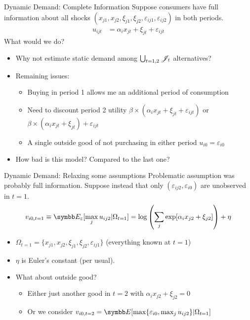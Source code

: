 \documentclass[aspectratio=169,11pt]{beamer}
\begin{document}
\begin{frame}{Dynamic Demand: Complete Information}
Suppose consumers have full information about all shocks $(x_{j1},x_{j2},\xi_{j1},\xi_{j2},\varepsilon_{ij1},\varepsilon_{ij2})$ in both periods. 
\begin{align*}
u_{ijt} &=   \alpha_i x_{jt}  +  \xi_{jt} + \varepsilon_{ijt}
\end{align*}
What would we do?
\begin{itemize}
\item Why not estimate static demand among $\bigcup_{t=1,2}  \mathscr{J}_t $ alternatives?
\item Remaining issues:
\begin{itemize}
\item Buying in period 1 allows me an additional period of consumption
\item Need to discount period 2 utility $\beta \times ( \alpha_i x_{jt}  +  \xi_{jt} + \varepsilon_{ijt})$ or $\beta \times ( \alpha_i x_{jt}  +  \xi_{jt} )+\varepsilon_{ijt}$
\item A single outside good of not purchasing in either period $ u_{i0} =  \varepsilon_{i0} $
\end{itemize}
\item How bad is this model? Compared to the last one?
\end{itemize}
\end{frame}



\begin{frame}{Dynamic Demand: Relaxing some assumptions}
Problematic assumption was probably full information. Suppose instead that only $(\varepsilon_{ij2},\varepsilon_{i0})$ are \alert{unobserved} in $t=1$. 
\begin{align*}
v_{i0,t=1} \equiv \E_{\varepsilon} [\max_j u_{ij2} | \Omega_{t=1} ] = \log \left( \sum_j \exp [ \alpha_i x_{j2}  +  \xi_{j2} ] \right) + \eta
\end{align*}
\begin{itemize}
\item $\Omega_{t=1}= \{x_{j1},x_{j2},\xi_{j1},\xi_{j2},\varepsilon_{ij1}\}$ (everything known at $t=1$) 
\item $\eta$ is Euler's constant (per usual).
\item What about outside good?
\begin{itemize}
\item Either just another good in $t=2$ with $\alpha_i x_{j2}+ \xi_{j2} = 0$
\item Or we consider $v_{i0,t=2}=\E [\max \{ \varepsilon_{i0}, \max_j u_{ij2} \}  | \Omega_{t=1}]$
\end{itemize}
\end{itemize}
\end{frame}
\end{document}
